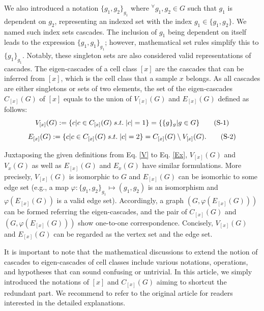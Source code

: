 \documentclass{article}
\begin{document}
We also introduced a notation $\{g_1, g_2\}_{g_1}$ where $^\forall g_1,g_2\in G$ such 
that $g_1$ is dependent on $g_2$, representing an indexed 
set with the index $g_1\in\{g_1, g_2\}$. We named such index sets cascades. The inclusion of $g_1$ 
being dependent on itself leads to the expression $\{g_1, g_1\}_{g_1}$; however, 
mathematical set rules simplify this to $\{g_1\}_{g_1}$. Notably, these singleton 
sets are also considered valid representations of cascades. The eigen-cascades of a cell class $[x]$ are the 
cascades that can be inferred from $[x]$, which is the cell class that a sample $x$ belongs. 
As all cascades are either singletons or sets of two elements, the set of the 
eigen-cascades $C_{[x]}(G)$ of $[x]$ equals to the union of $V_{[x]}(G)$ and 
$E_{[x]}(G)$ defined as follows:
\begin{equation}\label{Vx}
  V_{[x]}(G):=\{c|c\in C_{[x]}(G)\; s.t.\; |c|=1\}=\{\{g\}_g|g\in G\}
  \stepcounter{equation} \tag{S-\theequation}
\end{equation}
\begin{equation}\label{Ex}
  E_{[x]}(G):=\{c|c\in C_{[x]}(G)\; s.t.\; |c|=2\}=C_{[x]}(G)\setminus V_{[x]}(G).
  \stepcounter{equation} \tag{S-\theequation}
\end{equation}

Juxtaposing the given definitions from Eq. \eqref{V} to Eq. \eqref{Ex}, $V_{[x]}(G)$ and $V_x(G)$ 
as well as $E_{[x]}(G)$ and $E_x(G)$ have similar formulations. More precisely, $V_{[x]}(G)$ is isomorphic to $G$ and 
$E_{[x]}(G)$ can be isomorhic to some edge set (e.g., a map $\varphi:\{g_1,g_2\}_{g_1}\mapsto(g_1,g_2)$ 
is an isomorphism and $\varphi(E_{[x]}(G))$ is a valid edge set). Accordingly, a graph $(G, \varphi(E_{[x]}(G)))$ can be formed 
referring the eigen-cascades, and the pair of $C_{[x]}(G)$ and $(G, \varphi(E_{[x]}(G)))$ show one-to-one correspondence.
Concisely, $V_{[x]}(G)$ and $E_{[x]}(G)$ can be regarded as the vertex set and the edge set.

It is important to note that the mathematical discussions to extend the notion of cascades to eigen-cascades of 
cell classes include various notations, operations, and hypotheses that can sound confusing or untrivial. 
In this article, we simply introduced the notations of $[x]$ and $C_{[x]}(G)$ aiming to shortcut the redundant part. 
We recommend to refer to the original article for readers interested in the detailed explanations.
\end{document}
